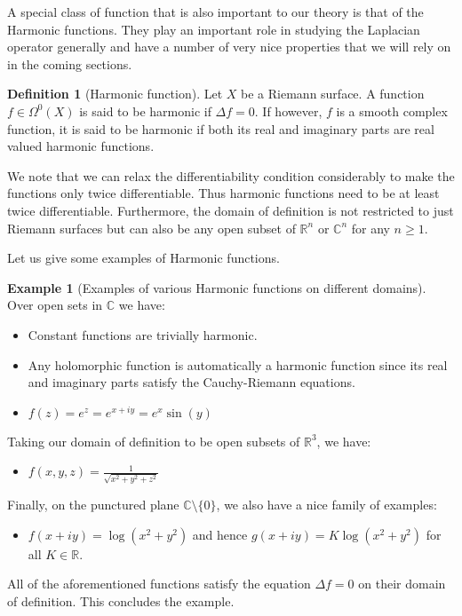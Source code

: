 \documentclass[11pt]{report}
\theoremstyle{definition}
\newtheorem{defn}[thm]{Definition}
\newtheorem{example}[thm]{Example}
\begin{document}
A special class of function that is also important to our theory is that of the 
Harmonic functions. They play an important role in studying the Laplacian operator generally and have a number of very nice properties that we will rely on in the coming sections.
\begin{defn}[Harmonic function]\label{HarmonicDef}
  Let $X$ be a Riemann surface. A function $f\in \Omega^0(X)$ is said to be harmonic if $\Delta f = 0$. If however, $f$ is a smooth complex function, it is said to be harmonic if both its real and imaginary parts are real valued harmonic functions.
\end{defn}
We note that we can relax the differentiability condition considerably to make the functions only twice differentiable. Thus harmonic functions need to be at least twice differentiable. Furthermore, the domain of definition is not restricted to just Riemann surfaces but can also be any open subset of $\mathbb{R}^n$ or $\mathbb{C}^n$ for any $n\geq 1$. 

Let us give some examples of Harmonic functions.

\begin{example}[Examples of various Harmonic functions on different domains]\label{harmonicexamples}
  Over open sets in $\mathbb{C}$ we have:
  \begin{itemize} 
    \item Constant functions are trivially harmonic.
    \item Any holomorphic function is automatically a harmonic function since its real and imaginary parts satisfy the Cauchy-Riemann equations.
    \item $f(z)=e^z=e^{x+iy}=e^x\sin(y)$
  \end{itemize}
  Taking our domain of definition to be open subsets of $\mathbb{R}^3$, we have:
  \begin{itemize} 
    \item $f(x,y,z)=\frac{1}{\sqrt{x^2+y^2+z^2}}$
  \end{itemize}
  Finally, on the punctured plane $\mathbb{C}\setminus \{0\}$, we also have a nice family of examples:
  \begin{itemize}
    \item $f(x+iy) = \log(x^2 + y^2)$ and hence $g(x+iy)=K \log(x^2+y^2)$ for all $K \in \mathbb{R}$.
  \end{itemize}
  All of the aforementioned functions satisfy the equation $\Delta f = 0$ on their domain of definition. This concludes the example.
\end{example}
\end{document}
